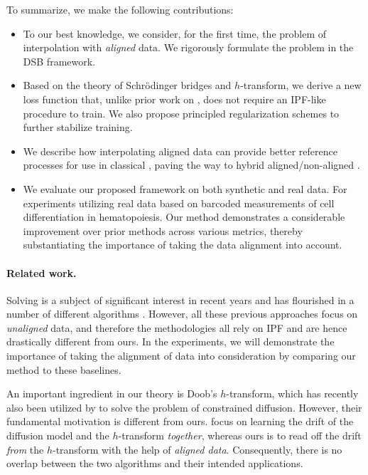 To summarize, we make the following contributions:
\begin{itemize}[topsep=0pt]
\item To our best knowledge, we consider, for the first time, the problem of interpolation with \emph{aligned} data. We rigorously formulate the problem in the \acrshort{DSB} framework.

\item Based on the theory of Schr{\"o}dinger bridges and $h$-transform, we derive a new loss function that, unlike prior work on , does not require an \acrshort{IPF}-like procedure to train. We also propose principled regularization schemes to further stabilize training.

\item We describe how interpolating aligned data can provide better reference processes for use in classical , paving the way to hybrid aligned/non-aligned .

\item {} We evaluate our proposed framework on both synthetic and real data. For experiments utilizing real data based on barcoded measurements of cell differentiation in hematopoiesis.
Our method demonstrates a considerable improvement over prior methods across various metrics, thereby substantiating the importance of taking the data alignment into account. 
\end{itemize}

\paragraph{Related work.}

Solving  is a subject of significant interest in recent years and has flourished in a number of different algorithms \citep{de2021diffusion,chen2021likelihood,vargas2021solving,bunne2022recovering,liu2022deep}. However, all these previous approaches focus on  \emph{unaligned} data, and therefore the methodologies all rely on \acrshort{IPF} and are hence drastically different from ours. In the experiments, we will demonstrate the importance of taking the alignment of data into consideration by comparing our method to these baselines.

An important ingredient in our theory is Doob's $h$-transform, which has recently also been utilized by \cite{liu2023learning} to solve the problem of constrained diffusion. However, their fundamental motivation is different from ours. \cite{liu2023learning} focus on learning the drift of the diffusion model and the $h$-transform \emph{together}, whereas ours is to read off the drift \emph{from} the $h$-transform with the help of {\em aligned data}. Consequently, there is no overlap between the two algorithms and their intended applications. 

